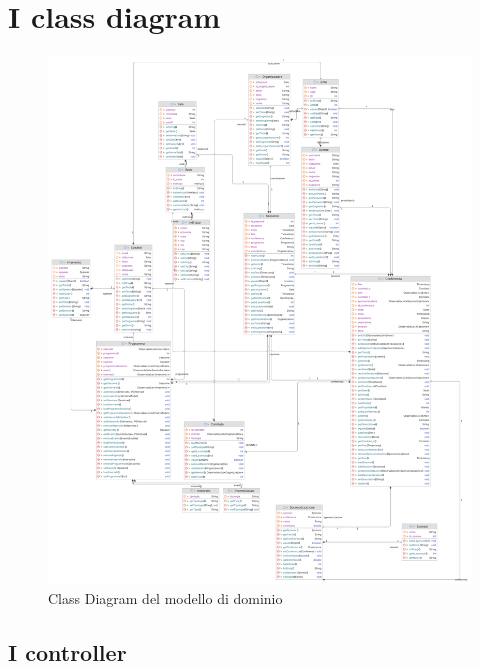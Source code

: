 \clearpage
\pagebreak

\section{I class diagram}
\begin{figure}[h!]
	\centering
	\includegraphics[scale=0.1]{Immagini/Modello_Dominio.png}
	\caption{Class Diagram del modello di dominio}\label{uml:modellodominio}
\end{figure}

\newpage
\subsection{I controller}

